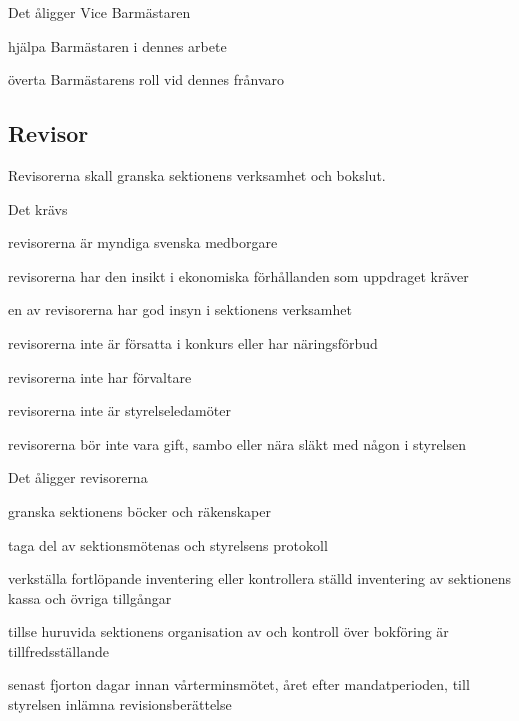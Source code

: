 \documentclass[pdfbookmarks,a4paper,11pt]{article}
\newcommand{\funktionar}[1]{%
  \subsection*{#1}\par
  \addcontentsline{toc}{subsection}{#1}}
\newlength{\itemcollength}
\newenvironment{reglemlista}{%
  \begin{list}{}{%
      \setlength{\labelwidth}{\itemcollength}%
      \setlength{\leftmargin}{\labelwidth + \labelsep}%
      \renewcommand{\makelabel}[1]{%
        \raisebox{0pt}[1ex][0pt]{%
          \makebox[\labelwidth][l]{%
            \parbox[t]{\itemcollength}{%
              \raggedright\hspace{0pt}##1}}}\hfill}%
      }}{%
  \end{list}}
\begin{document}
\begin{reglemlista}

	\item[Åligganden]
	Det åligger Vice Barmästaren
	\begin{attlista}
		\item hjälpa Barmästaren i dennes arbete
		\item överta Barmästarens roll vid dennes frånvaro
	\end{attlista}

\end{reglemlista}


\funktionar{Revisor}
Revisorerna skall granska sektionens verksamhet och bokslut.

\begin{reglemlista}

	\item[Krav]
	Det krävs
	\begin{attlista}
		\item revisorerna är myndiga svenska medborgare
		\item revisorerna har den insikt i ekonomiska förhållanden som uppdraget kräver
		\item en av revisorerna har god insyn i sektionens verksamhet
		\item revisorerna inte är försatta i konkurs eller har näringsförbud
		\item revisorerna inte har förvaltare
		\item revisorerna inte är styrelseledamöter
		\item revisorerna bör inte vara gift, sambo eller nära släkt med någon i styrelsen
	\end{attlista}

	\item[Åligganden]
	Det åligger revisorerna
	\begin{attlista}
		\item granska sektionens böcker och räkenskaper
		\item taga del av sektionsmötenas och styrelsens protokoll
		\item verkställa fortlöpande inventering eller kontrollera ställd inventering av sektionens kassa och övriga tillgångar
		\item tillse huruvida sektionens organisation av och kontroll över bokföring är tillfredsställande
		\item senast fjorton dagar innan vårterminsmötet, året
		efter mandatperioden, till styrelsen inlämna revisionsberättelse
	\end{attlista}


\end{reglemlista}
\end{document}
